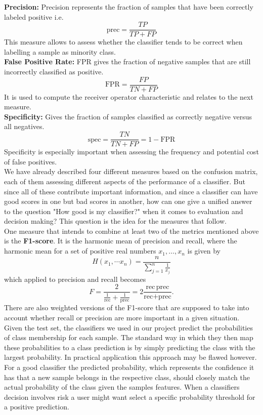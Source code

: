 \textbf{Precision:}
Precision represents the fraction of samples that have been correctly labeled positive i.e.
\[
	\text{prec} = \frac{TP}{TP + FP}
\]
This measure allows to assess whether the classifier tends to be correct when labelling a sample as minority class.\\

\textbf{False Positive Rate:}
FPR gives the fraction of negative samples that are still incorrectly classified as positive.
\[
	\text{FPR} = \frac{FP}{TN + FP}
\]
It is used to compute the receiver operator characteristic and relates to the next measure.\\

\textbf{Specificity:}
Gives the fraction of samples classified as correctly negative versus all negatives.
\[
	\text{spec} = \frac{TN}{TN + FP} = 1 - \text{FPR}
\]
Specificity is especially important when assessing the frequency and potential cost of false positives.\\


We have already described four different measures based on the confusion matrix, each of them assessing different aspects of the performance of a classifier.
But since all of these contribute important information, and since a classifier can have good scores in one but bad scores in another, 
how can one give a unified answer to the question "How good is my classifier?" when it comes to evaluation and decision making?
This question is the idea for the measures that follow.\\

One measure that intends to combine at least two of the metrics mentioned above is the \textbf{F1-score}.
It is the harmonic mean of precision and recall, where the harmonic mean for a set of positive real numbers $x_1, \dots, x_n$ is given by
\[
	H(x_1, \dotsm x_n) = \frac{n}{\sum_{j=1}^n \frac{1}{x_j}}
\]
which applied to precision and recall becomes
\[
	F = \frac{2}{ \frac{1}{\text{rec}} + \frac{1}{\text{prec}} } = 2 \frac{\text{rec} \, \text{prec}}{ \text{rec} + \text{prec} }.
\]
There are also weighted versions of the F1-score that are supposed to take into account whether recall or precision are more important in a given situation.\\

Given the test set, the classifiers we used in our project predict the probabilities of class membership for each sample.
The standard way in which they then map these probabilities to a class prediction is by simply predicting the class with the largest probability.
In practical application this approach may be flawed however. 
For a good classifier the predicted probability, which represents the confidence it has that a new sample belongs in the respective class, 
should closely match the actual probability of the class given the samples features. 
When a classifiers decision involves risk a user might want select a specific probability threshold for a positive prediction.

